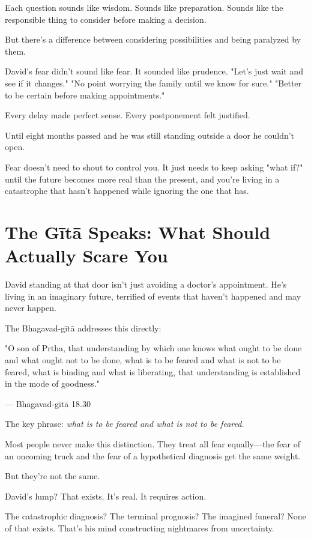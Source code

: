 \documentclass[11pt,twoside]{book}
\begin{document}
Each question sounds like wisdom. Sounds like preparation. Sounds like the responsible thing to consider before making a decision.

But there's a difference between considering possibilities and being paralyzed by them.

David's fear didn't sound like fear. It sounded like prudence. "Let's just wait and see if it changes." "No point worrying the family until we know for sure." "Better to be certain before making appointments."

Every delay made perfect sense. Every postponement felt justified.

Until eight months passed and he was still standing outside a door he couldn't open.

Fear doesn't need to shout to control you. It just needs to keep asking "what if?" until the future becomes more real than the present, and you're living in a catastrophe that hasn't happened while ignoring the one that has.

\section*{The Gītā Speaks: What Should Actually Scare You}

David standing at that door isn't just avoiding a doctor's appointment. He's living in an imaginary future, terrified of events that haven't happened and may never happen.

The Bhagavad-gītā addresses this directly:

\begin{pullquote}
"O son of Prtha, that understanding by which one knows what ought to be done and what ought not to be done, what is to be feared and what is not to be feared, what is binding and what is liberating, that understanding is established in the mode of goodness."

--- Bhagavad-gītā 18.30
\end{pullquote}

The key phrase: \textit{what is to be feared and what is not to be feared.}

Most people never make this distinction. They treat all fear equally—the fear of an oncoming truck and the fear of a hypothetical diagnosis get the same weight.

But they're not the same.

David's lump? That exists. It's real. It requires action.

The catastrophic diagnosis? The terminal prognosis? The imagined funeral? None of that exists. That's his mind constructing nightmares from uncertainty.
\end{document}
